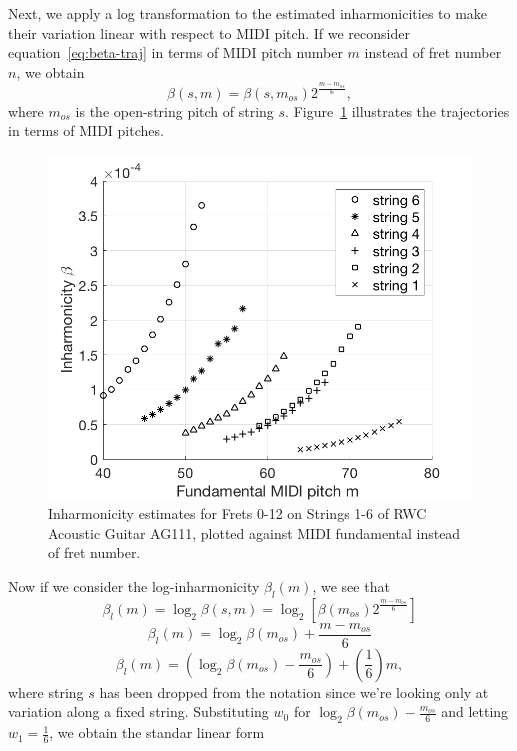 \documentclass[convention,peer-reviewed]{aesconf}
\begin{document}
Next, we apply a log transformation to the estimated inharmonicities to make their variation linear with respect to MIDI pitch. If we reconsider equation~\eqref{eq:beta-traj} in terms of MIDI pitch number $m$ instead of fret number $n$, we obtain
\begin{equation}
\beta(s,m) = \beta(s,m_{os})2^{\frac{m-m_{os}}{6}},
\end{equation}
where $m_{os}$ is the open-string pitch of string $s$. Figure~\ref{fig:beta-v-midi} illustrates the trajectories in terms of MIDI pitches.
\begin{figure}[h] 
\centering
\includegraphics[scale=0.25]{beta-v-midi}
\caption{Inharmonicity estimates for Frets 0-12 on Strings 1-6 of RWC Acoustic Guitar AG111, plotted against MIDI fundamental instead of fret number.}
\label{fig:beta-v-midi}
\end{figure}
Now if we consider the log-inharmonicity $\beta_{l}(m)$, we see that
\begin{equation}
\beta_l(m) = \log_2\beta(s,m) = \log_2[\beta(m_{os})2^{\frac{m-m_{os}}{6}}]
\end{equation}
\begin{equation}
\beta_l(m) = \log_2\beta(m_{os}) + \frac{m-m_{os}}{6}
\end{equation}
\begin{equation}
\beta_l(m) = (\log_2\beta(m_{os})-\frac{m_{os}}{6}) + (\frac{1}{6})m,
\end{equation}
where string $s$ has been dropped from the notation since we're looking only at variation along a fixed string. Substituting $w_0$ for $\log_2\beta(m_{os})-\frac{m_{os}}{6}$ and letting $w_1 = \frac{1}{6}$, we obtain the standar linear form
\end{document}

